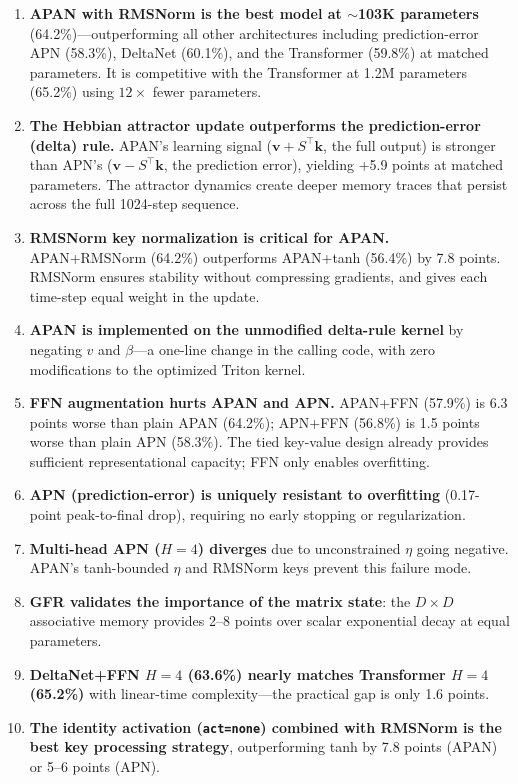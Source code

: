 \documentclass[11pt,a4paper]{article}
\begin{document}
\begin{enumerate}
\item \textbf{APAN with RMSNorm is the best model at $\sim$103K parameters} (64.2\%)---outperforming all other architectures including prediction-error APN (58.3\%), DeltaNet (60.1\%), and the Transformer (59.8\%) at matched parameters.
It is competitive with the Transformer at 1.2M parameters (65.2\%) using $12\times$ fewer parameters.

\item \textbf{The Hebbian attractor update outperforms the prediction-error (delta) rule.}
APAN's learning signal ($\mathbf{v} + S^\top\mathbf{k}$, the full output) is stronger than APN's ($\mathbf{v} - S^\top\mathbf{k}$, the prediction error), yielding +5.9 points at matched parameters.
The attractor dynamics create deeper memory traces that persist across the full 1024-step sequence.

\item \textbf{RMSNorm key normalization is critical for APAN.}
APAN+RMSNorm (64.2\%) outperforms APAN+tanh (56.4\%) by 7.8 points.
RMSNorm ensures stability without compressing gradients, and gives each time-step equal weight in the update.

\item \textbf{APAN is implemented on the unmodified delta-rule kernel} by negating $v$ and $\beta$---a one-line change in the calling code, with zero modifications to the optimized Triton kernel.

\item \textbf{FFN augmentation hurts APAN and APN.}
APAN+FFN (57.9\%) is 6.3 points worse than plain APAN (64.2\%); APN+FFN (56.8\%) is 1.5 points worse than plain APN (58.3\%).
The tied key-value design already provides sufficient representational capacity; FFN only enables overfitting.

\item \textbf{APN (prediction-error) is uniquely resistant to overfitting} (0.17-point peak-to-final drop), requiring no early stopping or regularization.

\item \textbf{Multi-head APN ($H{=}4$) diverges} due to unconstrained $\eta$ going negative. APAN's tanh-bounded $\eta$ and RMSNorm keys prevent this failure mode.

\item \textbf{GFR validates the importance of the matrix state}: the $D{\times}D$ associative memory provides 2--8 points over scalar exponential decay at equal parameters.

\item \textbf{DeltaNet+FFN $H{=}4$ (63.6\%) nearly matches Transformer $H{=}4$ (65.2\%)} with linear-time complexity---the practical gap is only 1.6 points.

\item \textbf{The identity activation (\texttt{act=none}) combined with RMSNorm is the best key processing strategy}, outperforming tanh by 7.8 points (APAN) or 5--6 points (APN).
\end{enumerate}
\end{document}
